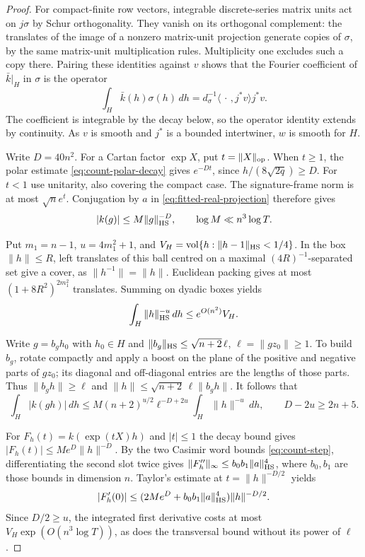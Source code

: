 \begin{proof}
For compact-finite row vectors, integrable discrete-series matrix
units act on \(j\sigma\) by Schur orthogonality. They vanish on its
orthogonal complement: the translates of the image of a nonzero
matrix-unit projection generate copies of \(\sigma\), by the same
matrix-unit multiplication rules. Multiplicity one excludes such a
copy there. Pairing these identities against \(v\) shows that the
Fourier coefficient of \(\bar k|_H\) in \(\sigma\) is the operator
\[
    \int_H\bar k(h)\sigma(h)\,dh
    =d_\sigma^{-1}\langle\,\cdot\,,j^*v\rangle j^*v .
\]
The coefficient is integrable by the decay below, so the operator
identity extends by continuity. As \(v\) is smooth and \(j^*\) is a
bounded intertwiner, \(w\) is smooth for \(H\).

Write \(D=40n^2\). For a Cartan factor \(\exp X\), put
\(t=\|X\|_{\rm op}\). When \(t\ge1\), the polar estimate
\eqref{eq:count-polar-decay} gives \(e^{-Dt}\), since
\(h/(8\sqrt{2q})\ge D\). For \(t<1\) use unitarity, also covering
the compact case. The signature-frame norm is at most \(\sqrt n e^t\).
Conjugation by \(a\) in \eqref{eq:fitted-real-projection} therefore gives
\[
           |k(g)|\le M\|g\|_{\rm HS}^{-D},
           \qquad \log M\ll n^3\log T .
\]

Put \(m_1=n-1\), \(u=4m_1^2+1\), and \(V_H=\mathrm{vol}\{h:\|h-1\|_{\rm HS}<1/4\}\).
In the box \(\|h\|\le R\), left translates of this ball centred on
a maximal \((4R)^{-1}\)-separated set give a cover, as
\(\|h^{-1}\|=\|h\|\). Euclidean packing gives at most
\((1+8R^2)^{2m_1^2}\) translates. Summing on dyadic boxes yields
\[
                  \int_H\|h\|_{\rm HS}^{-u}\,dh\le e^{O(n^2)}V_H .
\]

Write \(g=b_g h_0\) with \(h_0\in H\) and
\(\|b_g\|_{\rm HS}\le\sqrt{n+2}\,\ell\), \(\ell=\|gz_0\|\ge1\).
To build \(b_g\), rotate compactly and apply a boost on the plane of
the positive and negative parts of \(gz_0\); its diagonal and
off-diagonal entries are the lengths of those parts. Thus
\(\|b_gh\|\ge\ell\) and \(\|h\|\le\sqrt{n+2}\,\ell\|b_gh\|\). It follows that
\[
 \int_H |k(gh)|\,dh\le M(n+2)^{u/2}\ell^{-D+2u}\int_H\|h\|^{-u}\,dh,
       \qquad D-2u\ge 2n+5 .
\]

For \(F_h(t)=k(\exp(tX)h)\) and \(|t|\le1\) the decay bound gives
\(|F_h(t)|\le M e^D\|h\|^{-D}\). By the two Casimir word bounds
\eqref{eq:count-step}, differentiating the second slot twice gives
\(\|F_h''\|_\infty\le b_0 b_1\|a\|_{\rm HS}^4\), where \(b_0,b_1\) are those
bounds in dimension \(n\). Taylor's estimate at \(t=\|h\|^{-D/2}\) yields
\[
 |F'_h(0)|\le (2Me^D+b_0b_1\|a\|_{\rm HS}^4)\|h\|^{-D/2} .
\]
Since \(D/2\ge u\), the integrated first derivative costs at most
\(V_H\exp(O(n^3\log T))\), as does the transversal bound without its
power of \(\ell\).


\end{proof}
